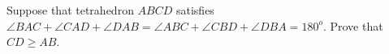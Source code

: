 Suppose that tetrahedron $ABCD$ satisfies $\angle BAC+\angle CAD+\angle DAB = \angle ABC+\angle CBD+\angle DBA = 180^o$. Prove that $CD \ge AB$.